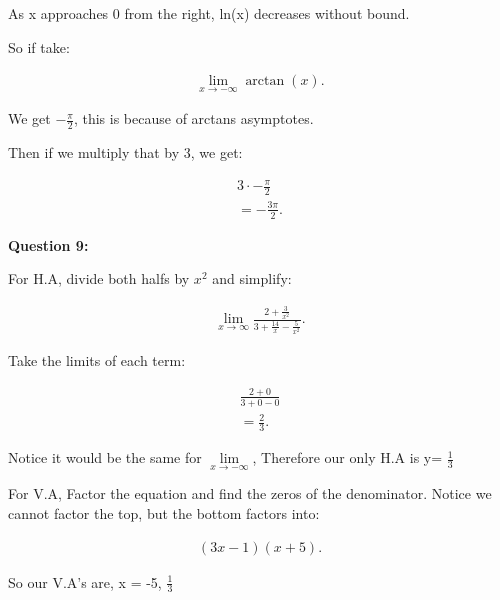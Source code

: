 \documentclass{report}
\begin{document}
    \bigbreak \noindent  \bigbreak \noindent 
    \bigbreak \noindent 
    As x approaches 0 from the right, ln(x) decreases without bound. 

    \bigbreak \noindent 
    So if take:

    \begin{align*}
        \lim\limits_{x \to - \infty}{\arctan(x)}
    .\end{align*}

    \bigbreak \noindent 
    We get $-\frac{\pi}{2}$, this is because of arctans asymptotes.

    \bigbreak \noindent 
    Then if we multiply that by 3, we get:

    \begin{align*}
        3 \cdot - \frac{\pi}{2} \\ 
        = - \frac{3\pi}{2}
    .\end{align*}

    \pagebreak \bigbreak \noindent
    \begin{Large}
        \textbf{Question 9:}
    \end{Large}

    \bigbreak \noindent 
    \bigbreak \noindent 
    For H.A, divide both halfs by $x^2$ and simplify:

    \begin{align*}
        \lim\limits_{x \to \infty}{ \frac{2 + \frac{3}{x^2}}{3 + \frac{14}{x} - \frac{5}{x^2}}}
    .\end{align*}

    \bigbreak \noindent 
    Take the limits of each term:

    \begin{align*}
        \frac{2+ 0}{3 + 0 - 0} \\ 
        = \frac{2}{3}
    .\end{align*}

    \bigbreak \noindent 
    Notice it would be the same for $\lim\limits_{x \to - \infty}{}$, Therefore our only H.A is y= $ \frac{1}{3}$

    \bigbreak \noindent 
    For V.A, Factor the equation and find the zeros of the denominator. Notice we cannot factor the top, but the bottom factors into:

    \begin{align*}
        \left(3x - 1\right) \left(x + 5\right)
    .\end{align*}

    \bigbreak \noindent 
    So our V.A's are, x = -5, $ \frac{1}{3}$
\end{document}
